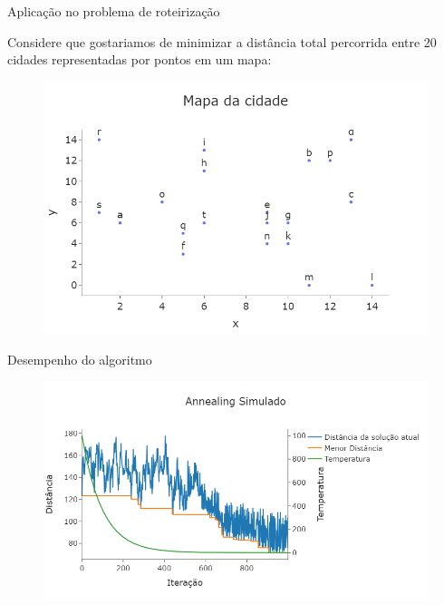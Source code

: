 \documentclass{beamer}
\begin{document}
\begin{frame}{Aplicação no problema de roteirização}

    Considere que gostariamos de minimizar a distância total percorrida entre 20 cidades representadas por pontos em um mapa:
    
    \begin{figure}
        \centering
        \includegraphics[width = 0.8 \textwidth]{assets/Resolucoes/Cidades.png}
        \label{fig:enter-label}
    \end{figure}
\end{frame}


\begin{frame}{Desempenho do algoritmo}
    \begin{figure}
        \centering
        \includegraphics[width = 1 \textwidth]{assets/Resolucoes/evolucao do algoritmo.png}
       \label{fig:enter-label}
    \end{figure}
\end{frame}
\end{document}
